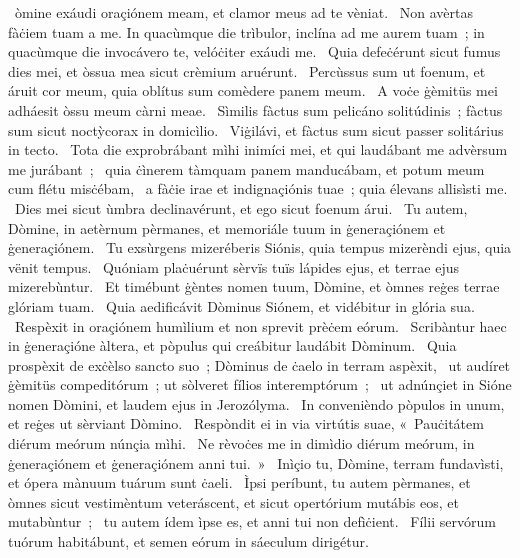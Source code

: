 { }
{%
~òmine exáudi oraçiónem meam, et clamor meus ad te vèniat. 
~Non avèrtas fàċiem tuam a me. In quacùmque die trìbulor, inclína ad me aurem tuam~; in quacùmque die invocávero te, velóċiter exáudi me. 
~Quia defeċérunt sicut fumus dies mei, et òssua mea sicut crèmium aruérunt. 
~Percùssus sum ut foenum, et áruit cor meum, quia oblítus sum comèdere panem meum. 
~A voċe ġèmitüs mei adháesit òssu meum càrni meae. 
~Sìmilis fàctus sum pelicáno solitúdinis~; fàctus sum sicut noctỳcorax in domicìlio. 
~Viġilávi, et fàctus sum sicut passer solitárius in tecto. 
~Tota die exprobrábant mìhi inimíci mei, et qui laudábant me advèrsum me jurábant~; 
~quia ċìnerem tàmquam panem manducábam, et potum meum cum flétu misċébam, 
~a fàċie irae et indignaçiónis tuae~; quia élevans allisìsti me. 
~Dies mei sicut ùmbra declinavérunt, et ego sicut foenum árui. 
~Tu autem, Dòmine, in aetèrnum pèrmanes, et memoriále tuum in ġeneraçiónem et ġeneraçiónem. 
~Tu exsùrgens mizeréberis Siónis, quia tempus mizerèndi ejus, quia vënit tempus. 
~Quóniam plaċuérunt sèrvïs tuïs lápides ejus, et terrae ejus mizerebùntur. 
~Et timébunt ġèntes nomen tuum, Dòmine, et òmnes reġes terrae glóriam tuam. 
~Quia aedificávit Dòminus Siónem, et vidébitur in glória sua. 
~Respèxit in oraçiónem humìlium et non sprevit prèċem eórum. 
~Scribàntur haec in ġeneraçióne àltera, et pòpulus qui creábitur laudábit Dòminum. 
~Quia prospèxit de exċèlso sancto suo~; Dòminus de ċaelo in terram aspèxit, 
~ut audíret ġèmitüs compeditórum~; ut sòlveret fílios interemptórum~; 
~ut adnúnçiet in Sióne nomen Dòmini, et laudem ejus in Jerozólyma. 
~In convenièndo pòpulos in unum, et reġes ut sèrviant Dòmino. 
~Respòndit ei in via virtútis suae, «~Pauċitátem diérum meórum núnçia mìhi.
~Ne rèvoċes me in dimìdio diérum meórum, in ġeneraçiónem et ġeneraçiónem anni tui.~»
~Inìçio tu, Dòmine, terram fundavìsti, et ópera mànuum tuárum sunt ċaeli. 
~Ìpsi períbunt, tu autem pèrmanes, et òmnes sicut vestimèntum veteráscent, et sicut opertórium mutábis eos, et mutabùntur~; 
~tu autem ídem ìpse es, et anni tui non defìċient. 
~Fílii servórum tuórum habitábunt, et semen eórum in sáeculum dirigétur. 
}
